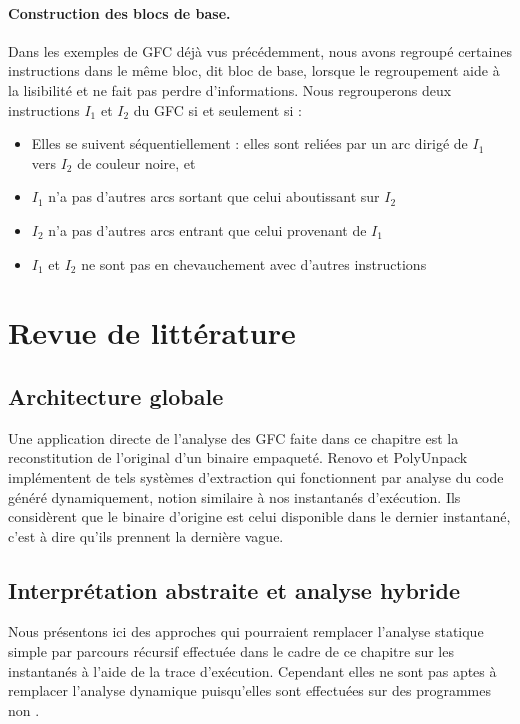 \paragraph{Construction des blocs de base.}
Dans les exemples de GFC déjà vus précédemment, nous avons regroupé certaines instructions dans le même bloc, dit bloc de base, lorsque le regroupement aide à la lisibilité et ne fait pas perdre d'informations. Nous regrouperons deux instructions $I_1$ et $I_2$ du GFC si et seulement si :
\begin{itemize}
 \item Elles se suivent séquentiellement : elles sont reliées par un arc dirigé de $I_1$ vers $I_2$ de couleur noire, et
 \item $I_1$ n'a pas d'autres arcs sortant que celui aboutissant sur $I_2$
 \item $I_2$ n'a pas d'autres arcs entrant que celui provenant de $I_1$
 \item $I_1$ et $I_2$ ne sont pas en chevauchement avec d'autres instructions
\end{itemize}

\section{Revue de littérature}
\subsection{Architecture globale}
Une application directe de l'analyse des GFC faite dans ce chapitre est la reconstitution de l'original d'un binaire empaqueté.
Renovo \cite{renovo} et PolyUnpack \cite{polyunpack} implémentent de tels systèmes d'extraction qui fonctionnent par analyse du code généré dynamiquement, notion similaire à nos instantanés d'exécution. Ils considèrent que le binaire d'origine est celui disponible dans le dernier instantané, c'est à dire qu'ils prennent la dernière vague.


\subsection{Interprétation abstraite et analyse hybride}
Nous présentons ici des approches qui pourraient remplacer l'analyse statique simple par parcours récursif effectuée dans le cadre de ce chapitre sur les instantanés à l'aide de la trace d'exécution. Cependant elles ne sont pas aptes à remplacer l'analyse dynamique puisqu'elles sont effectuées sur des programmes non \sms.

